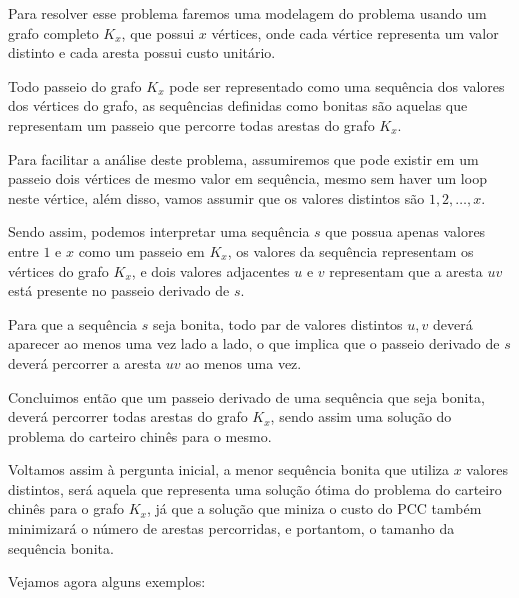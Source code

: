         Para resolver esse problema faremos uma modelagem do problema usando um grafo completo $K_x$, que possui $x$ vértices, onde cada vértice representa um valor distinto e cada aresta possui custo unitário.

        Todo passeio do grafo $K_x$ pode ser representado como uma sequência dos valores dos vértices do grafo, as sequências definidas como bonitas são aquelas que representam um passeio que percorre todas arestas do grafo $K_x$.

        Para facilitar a análise deste problema, assumiremos que pode existir em um passeio dois vértices de mesmo valor em sequência, mesmo sem haver um loop neste vértice, além disso, vamos assumir que os valores distintos são $1, 2, \dots, x$.

        Sendo assim, podemos interpretar uma sequência $s$ que possua apenas valores entre $1$ e $x$ como um passeio em $K_x$, os valores da sequência representam os vértices do grafo $K_x$, e dois valores adjacentes $u$ e $v$ representam que a aresta $uv$ está presente no passeio derivado de $s$. 
        
        Para que a sequência $s$ seja bonita, todo par de valores distintos $u, v$ deverá aparecer ao menos uma vez lado a lado, o que implica que o passeio derivado de $s$ deverá percorrer a aresta $uv$ ao menos uma vez.

        Concluimos então que um passeio derivado de uma sequência que seja bonita, deverá percorrer todas arestas do grafo $K_x$, sendo assim uma solução do problema do carteiro chinês para o mesmo.

        Voltamos assim à pergunta inicial, a menor sequência bonita que utiliza $x$ valores distintos, será aquela que representa uma solução ótima do problema do carteiro chinês para o grafo $K_x$, já que a solução que miniza o custo do PCC também minimizará o número de arestas percorridas, e portantom, o tamanho da sequência bonita.
 
        Vejamos agora alguns exemplos:

